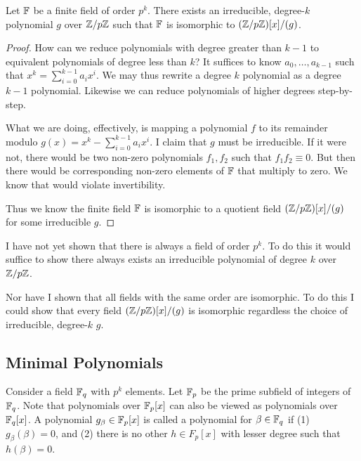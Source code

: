 \begin{lemma}
  Let $\mathbb{F}$ be a finite field of order $p^k$. There exists an
  irreducible, degree-$k$ polynomial $g$ over $\mathbb{Z} / p\mathbb{Z}$ such that $\mathbb{F}$ is
  isomorphic to $\mathopen{}\left( {\mathbb{Z} / p\mathbb{Z}} \right)\mathclose{}[x]/(g)$.
\end{lemma}

\begin{proof}
  How can we reduce polynomials with degree greater than $k-1$ to
  equivalent polynomials of degree less than $k$? It suffices to know
  $a_0, \ldots, a_{k-1}$ such that $x^k = \sum_{i=0}^{k-1} a_i x^i$. We
  may thus rewrite a degree $k$ polynomial as a degree $k-1$ polynomial.
  Likewise we can reduce polynomials of higher degrees step-by-step.

  What we are doing, effectively, is mapping a polynomial $f$ to its
  remainder modulo $g(x) = x^k - \sum_{i=0}^{k-1} a_i x^i$. I claim that
  $g$ must be irreducible. If it were not, there would be two non-zero
  polynomials $f_1, f_2$ such that $f_1 f_2 \equiv 0$. But then there
  would be corresponding non-zero elements of $\mathbb{F}$ that multiply to
  zero. We know that would violate invertibility.

  Thus we know the finite field $\mathbb{F}$ is isomorphic to a quotient field
  $\mathopen{}\left( {\mathbb{Z} / p\mathbb{Z}} \right)\mathclose{}[x]/(g)$ for some irreducible $g$.
\end{proof}

\begin{remark}
  I have not yet shown that there is always a field of order $p^k$. To
  do this it would suffice to show there always exists an irreducible
  polynomial of degree $k$ over $\mathbb{Z} / p\mathbb{Z}$.

  Nor have I shown that all fields with the same order are isomorphic.
  To do this I could show that every field $\mathopen{}\left( {\mathbb{Z} / p\mathbb{Z}} \right)\mathclose{}[x]/(g)$ is
  isomorphic regardless the choice of irreducible, degree-$k$ $g$.
\end{remark}

\subsection{Minimal Polynomials}

\begin{definition}
  Consider a field $\mathbb{F}_q$ with $p^k$ elements. Let $\mathbb{F}_p$ be the prime
  subfield of integers of $\mathbb{F}_q$. Note that polynomials over $\mathbb{F}_p[x]$
  can also be viewed as polynomials over $\mathbb{F}_q[x]$. A polynomial
  $g_\beta \in \mathbb{F}_p[x]$ is called a  polynomial for
  $\beta \in \mathbb{F}_q$ if (1) $g_\beta(\beta) = 0$, and (2) there is no
  other $h \in F_p[x]$ with lesser degree such that $h(\beta) = 0$.
\end{definition}

